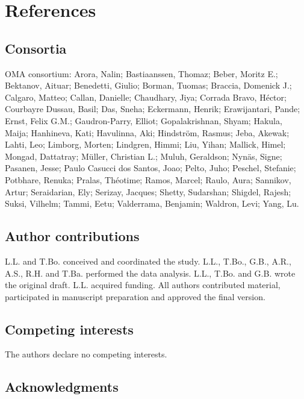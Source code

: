 \documentclass[
  sn-nature,
]{sn-jnl}
\begin{document}
\section{References}\label{references}

\renewcommand{\bibsection}{}


\subsection{Consortia}\label{sec-consortium}

OMA consortium: Arora, Nalin; Bastiaanssen, Thomaz; Beber, Moritz E.;
Bektanov, Aituar; Benedetti, Giulio; Borman, Tuomas; Braccia, Domenick
J.; Calgaro, Matteo; Callan, Danielle; Chaudhary, Jiya; Corrada Bravo,
Héctor; Courbayre Dussau, Basil; Das, Sneha; Eckermann, Henrik;
Erawijantari, Pande; Ernst, Felix G.M.; Gaudron-Parry, Elliot;
Gopalakrishnan, Shyam; Hakula, Maija; Hanhineva, Kati; Havulinna, Aki;
Hindström, Rasmus; Jeba, Akewak; Lahti, Leo; Limborg, Morten; Lindgren,
Himmi; Liu, Yihan; Mallick, Himel; Mongad, Dattatray; Müller, Christian
L.; Muluh, Geraldson; Nynäs, Signe; Pasanen, Jesse; Paulo Casucci dos
Santos, Joao; Pelto, Juho; Peschel, Stefanie; Potbhare, Renuka; Pralas,
Théotime; Ramos, Marcel; Raulo, Aura; Sannikov, Artur; Seraidarian, Ely;
Serizay, Jacques; Shetty, Sudarshan; Shigdel, Rajesh; Suksi, Vilhelm;
Tammi, Eetu; Valderrama, Benjamin; Waldron, Levi; Yang, Lu.

\subsection{Author contributions}\label{sec-contributions}

L.L. and T.Bo. conceived and coordinated the study. L.L., T.Bo., G.B.,
A.R., A.S., R.H. and T.Ba. performed the data analysis. L.L., T.Bo. and
G.B. wrote the original draft. L.L. acquired funding. All authors
contributed material, participated in manuscript preparation and
approved the final version.

\subsection{Competing interests}\label{sec-interests}

The authors declare no competing interests.

\subsection{Acknowledgments}\label{sec-acknowledgments}
\end{document}
